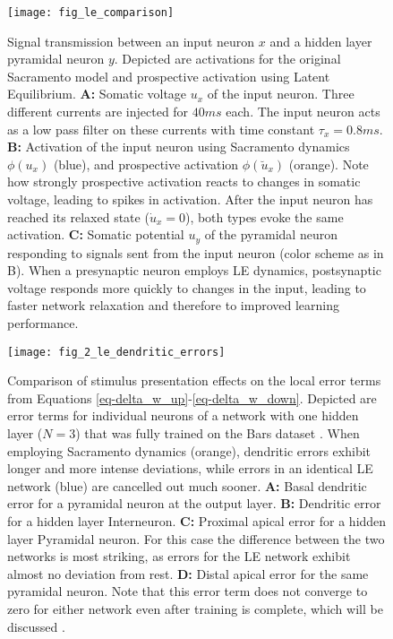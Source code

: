 \begin{figure}[t]
  \centering
  \texttt{[image: fig\_le\_comparison]}
  \caption{Signal transmission between an input neuron $x$ and a hidden layer pyramidal neuron $y$. Depicted are
    activations for the original Sacramento model and prospective activation using Latent Equilibrium. \textbf{A:} Somatic
    voltage $u_x$ of the input neuron. Three different currents are injected for $40ms$ each. The input neuron acts as a
    low pass filter on these currents with time constant $\tau_x = 0.8 ms$. \textbf{B:} Activation of the input neuron
    using Sacramento dynamics $\phi(u_x)$ (blue), and prospective activation $\phi(\breve{u}_x)$ (orange). Note how
    strongly prospective activation reacts to changes in somatic voltage, leading to spikes in activation. After the input
    neuron has reached its relaxed state ($\dot{u}_x = 0$), both types evoke the same activation. \textbf{C:} Somatic
    potential $u_y$ of the pyramidal neuron responding to signals sent from the input neuron (color scheme as in B). When
    a presynaptic neuron employs LE dynamics, postsynaptic voltage responds more quickly to changes in the input, leading
    to faster network relaxation and therefore to improved learning performance.}
  \label{fig-comparison-le}
\end{figure}


\begin{figure}[t]
  \centering
  \texttt{[image: fig\_2\_le\_dendritic\_errors]}
  \caption{Comparison of stimulus presentation effects on the local error terms from Equations
    \ref{eq-delta_w_up}-\ref{eq-delta_w_down}. Depicted are error terms for individual neurons of a network with one
    hidden layer ($N=3$) that was fully trained on the Bars dataset . When employing Sacramento dynamics
    (orange), dendritic errors exhibit longer and more intense deviations, while errors in an identical LE network
    (blue) are cancelled out much sooner. \textbf{A:} Basal dendritic error for a pyramidal neuron at the output layer.
    \textbf{B:} Dendritic error for a hidden layer Interneuron. \textbf{C:} Proximal apical error for a hidden layer
    Pyramidal neuron. For this case the difference between the two networks is most striking, as errors for the LE
    network exhibit almost no deviation from rest. \textbf{D:} Distal apical error for the same pyramidal neuron. Note
    that this error term does not converge to zero for either network even after training is complete, which will be
    discussed .}
  \label{fig-error-comp-le}
\end{figure}

